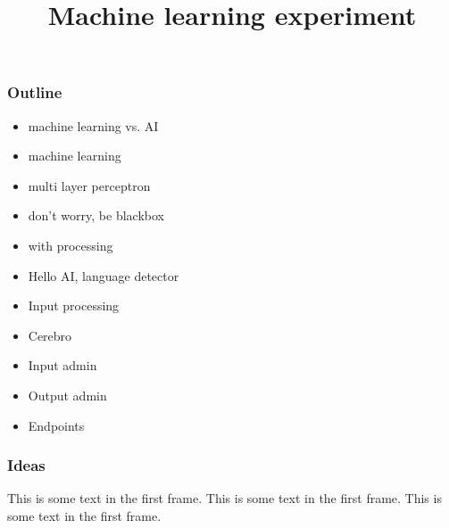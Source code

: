 \documentclass{beamer}
\title{Machine learning experiment}
\author{}
\institute{}
\date{}
\begin{document}
\frame{\titlepage}

\begin{frame}
    \frametitle{Outline}
    \begin{itemize}
        \item{machine learning vs. AI}
        \item{machine learning}
        \item{multi layer perceptron}
        \item{don't worry, be blackbox}
        \item{with processing}
        \item{Hello AI, language detector}
        \item{Input processing}
        \item{Cerebro}
        \item{Input admin}
        \item{Output admin}
        \item{Endpoints}
    \end{itemize}
\end{frame}



\begin{frame}
\frametitle{Ideas}
This is some text in the first frame. This is some text in the first frame. This is some text in the first frame.
\end{frame}
\end{document}
